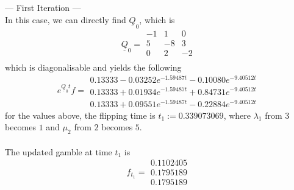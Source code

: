 \documentclass{article}
\begin{document}
--- First Iteration ---\\
In this case, we can directly find $\underline{Q}_{0}$, which is
\begin{equation*} 
 \underline{Q}_{0}= 
 \begin{array}{|rrr|}
  -1 & 1 & 0 \\
  5 & -8 & 3 \\
  0 & 2 & -2 \\
 \end{array}
 \end{equation*}
which is diagonalisable and yields the following
\begin{equation*} 
 e^{\underline{Q}_{0}t}f= 
 \begin{array}{|r|}
  0.13333-0.03252e^{-1.59487t}-0.10080e^{-9.40512t}\\
  0.13333+0.01934e^{-1.59487t}+0.84731e^{-9.40512t}\\
  0.13333+0.09551e^{-1.59487t}-0.22884e^{-9.40512t}
 \end{array}
 \end{equation*}
for the values above, the flipping time is $t_{1}:= 0.339073069$, where $\lambda_{1}$ from $3$ becomes $1$ and $\mu_{2}$ from $2$ becomes $5$.\\\\
The updated gamble at time $t_{1}$ is
\begin{equation*}  
 f_{t_1}= 
 \begin{array}{|c|}
  0.1102405\\
  0.1795189\\
  0.1795189
 \end{array}
 \end{equation*}\\\\
\end{document}
